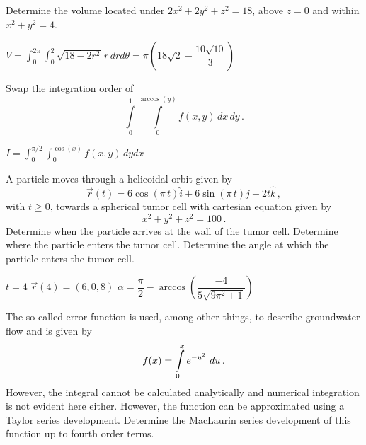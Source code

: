 \begin{Exercise} Determine the volume located under $2x^2+2y^2+z^2=18$, above $z=0$ and within $x^2+y^2=4$.
\end{Exercise}

\begin{Answer}
$\displaystyle V = \int_0^{2\pi} \int_0^2 \sqrt{18-2r^2}\, r\, dr d\theta = \pi\left(18\sqrt{2} - \dfrac{10\sqrt{10}}{3} \right)$    
\end{Answer}




\begin{Exercise} Swap the integration order of
$$
\int\limits_0^1\int\limits_{0}^{\arccos(y)}f(x,y)\,dx\,dy\,.
$$
\end{Exercise}

\begin{Answer}
$\displaystyle I = \int_0^{\pi/2} \int_0^{\cos(x)} f(x,y)\, dy dx$    
\end{Answer}



\begin{Exercise} A particle moves through a helicoidal orbit given by
$$
\vec{r}(t)=6\cos(\pi\,t)\hat{i}+6\sin(\pi\,t)\hat{j}+2t\hat{k}\,,
$$
with $t\geq0$, towards a spherical tumor cell with cartesian equation given by
$$
x^2+y^2+z^2=100\,.
$$
\Question Determine when the particle arrives at the wall of the tumor cell.
\Question Determine where the particle enters the tumor cell.
\Question Determine the angle at which the particle enters the tumor cell. 
\end{Exercise}

\begin{Answer}

\Question $t=4$
\Question $\vec{r}(4) = (6,0,8)$
\Question $\alpha = \dfrac{\pi}{2} - \arccos\left(\dfrac{-4}{5\sqrt{9\pi^2+1}}\right)$
    
\end{Answer}




\begin{Exercise} The so-called error function is used, among other things, to describe groundwater flow and is given by
\[f(x)=\displaystyle \int\limits_0^x e^{-u^2}\ du\,. \]
However, the integral cannot be calculated analytically and numerical integration is not evident here either. However, the function can be approximated using a Taylor series development. Determine the MacLaurin series development of this function up to fourth order terms. 
\end{Exercise}

